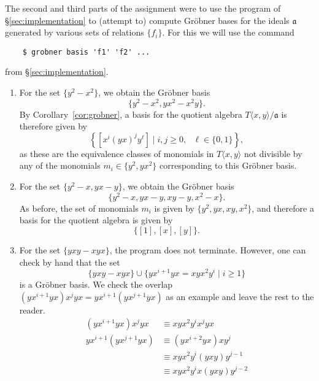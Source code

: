 The second and third parts of the assignment were to use the program of \S\ref{sec:implementation} to (attempt to) compute Gr\"obner bases for the ideals $\mathfrak{a}$ generated by various sets of relations $\{f_i\}$. For this we will use the command
\begin{verbatim}
	$ grobner basis 'f1' 'f2' ...
\end{verbatim}
from \S\ref{sec:implementation}.

\begin{enumerate}
	\item For the set $\{y^2-x^2\}$, we obtain the Gr\"obner basis
	\begin{equation*}
		\{y^2-x^2,yx^2-x^2y\}.
	\end{equation*}
    By Corollary~\ref{cor:grobner}, a basis for the quotient algebra $T\langle x,y\rangle/\mathfrak{a}$ is therefore given by
    \begin{equation}
      \label{eqn:basisone}
    \left\{[x^i(yx)^jy^\ell]\mid i,j\ge 0,\text{ }\ell\in\{0,1\}\right\},
    \end{equation}
    as these are the equivalence classes of monomials in $T\langle x,y\rangle$ not divisible by any of the monomials $m_i\in\{y^2,yx^2\}$ corresponding to this Gr\"obner basis.
	\item For the set $\{y^2-x,yx-y\}$, we obtain the Gr\"obner basis
    \begin{equation*}
      \{y^2 - x,yx - y,xy - y,x^2 - x\}.
    \end{equation*}
    As before, the set of monomials $m_i$ is given by $\{y^2,yx,xy,x^2\}$, and therefore a basis for the quotient algebra is given by
    \begin{equation*}
      \{[1],[x],[y]\}.
    \end{equation*}
    \item\label{item:infinite-case-yxy} For the set $\{yxy-xyx\}$, the program does not terminate. However, one can check by hand that the set
    \[
    	\{yxy - xyx\} \cup \{yx^{i+1}yx = xyx^2 y^i \mid i \geq 1\}
    \]
    is a Gr\"obner basis. We check the overlap $(yx^{i+1}yx)x^j yx = yx^{i+1}(yx^{j+1}yx)$ as an example and leave the rest to the reader. 
    \begin{align*}
    	(yx^{i+1}yx)x^j yx &\equiv xyx^2 y^i x^j yx\\
    	yx^{i+1}(yx^{j+1}yx) &\equiv (yx^{i+2}yx)xy^j\\
    	&\equiv xyx^2 y^i (yxy) y^{j-1}\\
    	&\equiv xyx^2 y^i x (yxy) y^{j-2}\\

\end{align*}
\end{enumerate}
